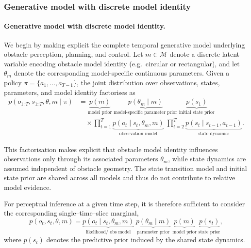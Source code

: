 \documentclass[a4paper, twoside]{article}
\begin{document}
\subsubsection{Generative model with discrete model identity}

\paragraph{Generative model with discrete model identity.}

We begin by making explicit the complete temporal generative model underlying obstacle
perception, planning, and control.
Let $m \in \mathcal{M}$ denote a discrete latent variable encoding obstacle model identity
(e.g.\ circular or rectangular), and let $\theta_m$ denote the corresponding model-specific
continuous parameters.
Given a policy $\pi=\{a_1,\dots,a_{T-1}\}$, the joint distribution over observations,
states, parameters, and model identity factorises as
\begin{equation}
\label{eq:full_gen_model_m}
\begin{aligned}
p(o_{1:T}, s_{1:T}, \theta, m \mid \pi)
&=
\underbrace{p(m)}_{\text{model prior}}
\;
\underbrace{p(\theta_m \mid m)}_{\text{model-specific parameter prior}}
\;
\underbrace{p(s_1)}_{\text{initial state prior}}\\
&\quad\times
\prod_{t=1}^{T}
\underbrace{p(o_t \mid s_t, \theta_m, m)}_{\text{observation model}}
\;
\prod_{t=2}^{T}
\underbrace{p(s_t \mid s_{t-1}, a_{t-1})}_{\text{state dynamics}} .
\end{aligned}
\end{equation}

This factorisation makes explicit that obstacle model identity influences observations
only through its associated parameters $\theta_m$, while state dynamics are assumed
independent of obstacle geometry.
The state transition model and initial state prior are shared across all models and thus
do not contribute to relative model evidence.

For perceptual inference at a given time step, it is therefore sufficient to consider
the corresponding single--time--slice marginal,
\begin{equation}
\label{eq:single_slice_gen_model_m}
p(o_t, s_t, \theta, m)
=
\underbrace{p(o_t \mid s_t, \theta_m, m)}_{\text{likelihood/ obs model}}
\;
\underbrace{p(\theta_m \mid m)}_{\text{parameter prior}}
\;
\underbrace{p(m)}_{\text{model prior}}
\;
\underbrace{p(s_t)}_{\text{state prior}},
\end{equation}
where $p(s_t)$ denotes the predictive prior induced by the shared state dynamics.
\end{document}

